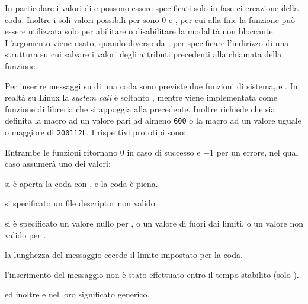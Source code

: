 In particolare i valori di  e  possono essere
specificati solo in fase ci creazione della coda.  Inoltre i soli valori
possibili per  sono 0 e , per cui alla fine
la funzione può essere utilizzata solo per abilitare o disabilitare la
modalità non bloccante. L'argomento  viene usato, quando
diverso da , per specificare l'indirizzo di una struttura su cui
salvare i valori degli attributi precedenti alla chiamata della funzione.

Per inserire messaggi su di una coda sono previste due funzioni di sistema,
 e . In realtà su Linux la \textit{system
  call} è soltanto , mentre  viene
implementata come funzione di libreria che si appoggia alla
precedente. Inoltre  richiede che sia definita la macro
 ad un valore pari ad almeno \texttt{600} o la macro
 ad un valore uguale o maggiore di \texttt{200112L}.
I rispettivi prototipi sono:

\begin{funcproto}{
}

{Entrambe le funzioni ritornano $0$ in caso di successo e $-1$ per un errore,
  nel qual caso  assumerà uno dei valori:
  \begin{errlist}
    \item[\errcode{EAGAIN}] si è aperta la coda con , e la
      coda è piena.
    \item[\errcode{EBADF}] si specificato un file descriptor non valido.
    \item[\errcode{EINVAL}] si è specificato un valore nullo per
      , o un valore di  fuori dai limiti, o
      un valore non valido per .
    \item[\errcode{EMSGSIZE}] la lunghezza del messaggio 
      eccede il limite impostato per la coda.
    \item[\errcode{ETIMEDOUT}] l'inserimento del messaggio non è stato
      effettuato entro il tempo stabilito (solo ).
  \end{errlist}
  ed inoltre  e  nel loro significato generico.
}
\end{funcproto}

